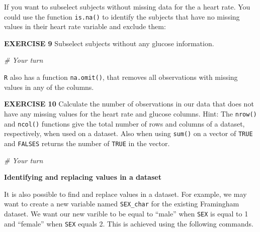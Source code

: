 \documentclass[
]{article}
\newenvironment{Shaded}{\begin{snugshade}}{\end{snugshade}}
\newcommand{\CommentTok}[1]{\textcolor[rgb]{0.56,0.35,0.01}{\textit{#1}}}
\newcommand{\DecValTok}[1]{\textcolor[rgb]{0.00,0.00,0.81}{#1}}
\newcommand{\KeywordTok}[1]{\textcolor[rgb]{0.13,0.29,0.53}{\textbf{#1}}}
\newcommand{\NormalTok}[1]{#1}
\newcommand{\OperatorTok}[1]{\textcolor[rgb]{0.81,0.36,0.00}{\textbf{#1}}}
\newcommand{\OtherTok}[1]{\textcolor[rgb]{0.56,0.35,0.01}{#1}}
\newcommand{\StringTok}[1]{\textcolor[rgb]{0.31,0.60,0.02}{#1}}
\begin{document}
If you want to subselect subjects without missing data for the a heart
rate. You could use the function \texttt{is.na()} to identify the
subjects that have no missing values in their heart rate variable and
exclude them:

\begin{Shaded}
\end{Shaded}

\textbf{EXERCISE 9} Subselect subjects without any glucose information.

\begin{Shaded}
\begin{Highlighting}[]
\CommentTok{# Your turn}
\end{Highlighting}
\end{Shaded}

\texttt{R} also has a function \texttt{na.omit()}, that removes all
observations with missing values in any of the columns.

\textbf{EXERCISE 10} Calculate the number of observations in our data
that does not have any missing values for the heart rate and glucose
columns. Hint: The \texttt{nrow()} and \texttt{ncol()} functions give
the total number of rows and columns of a dataset, respectively, when
used on a dataset. Also when using \texttt{sum()} on a vector of
\texttt{TRUE} and \texttt{FALSES} returns the number of \texttt{TRUE} in
the vector.

\begin{Shaded}
\begin{Highlighting}[]
\CommentTok{# Your turn}
\end{Highlighting}
\end{Shaded}

\textbf{Identifying and replacing values in a dataset}

It is also possible to find and replace values in a dataset. For
example, we may want to create a new variable named \texttt{SEX\_char}
for the existing Framingham dataset. We want our new varible to be equal
to ``male'' when \texttt{SEX} is equal to 1 and ``female'' when
\texttt{SEX} equals 2. This is achieved using the following commands.

\begin{Shaded}
\end{Shaded}
\end{document}
